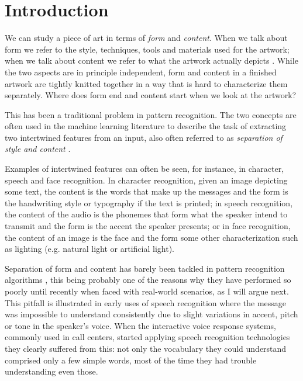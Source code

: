 
\chapter{Introduction}
\label{chap:intro}




We can study a piece of art in terms of \emph{form} and \emph{content}.
When we talk about form we refer to the style, techniques, tools and materials used for the artwork; when we talk about content we refer to what the artwork actually depicts \cite{Esaak}.
While the two aspects are in principle independent, form and content in a finished artwork are tightly knitted together in a way that is hard to characterize them separately. Where does form end and content start when we look at the artwork? \cite{Xie2007}

This has been a traditional problem in pattern recognition.
The two concepts are often used in the machine learning literature to describe the task of extracting two intertwined features from an input, also often referred to as \emph{separation of style and content} \cite{Tenenbaum1997,Tenenbaum2000}.

Examples of intertwined features can often be seen, for instance, in character, speech and face recognition.
In character recognition, given an image depicting some text, the content is the words that make up the messages and the form is the handwriting style or typography if the text is printed; in speech recognition, the content of the audio is the phonemes that form what the speaker intend to transmit and the form is the accent the speaker presents; or in face recognition, the content of an image is the face and the form some other characterization such as lighting (e.g. natural light or artificial light).

Separation of form and content has barely been tackled in pattern recognition algorithms \cite{Karayev2014}, this being probably one of the reasons why they have performed so poorly until recently when faced with real-world scenarios, as I will argue next.
This pitfall is illustrated in early uses of speech recognition where the message was impossible to understand consistently due to slight variations in accent, pitch or tone in the speaker's voice.
When the interactive voice response systems, commonly used in call centers, started applying speech recognition technologies they clearly suffered from this: not only the vocabulary they could understand comprised only a few simple words, most of the time they had trouble understanding even those.

